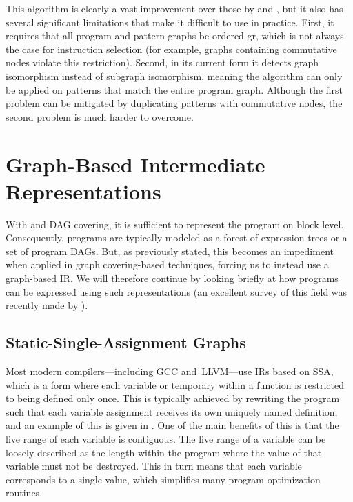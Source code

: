 This algorithm is clearly a vast improvement over those by
\citeauthor{Ullmann1976} and \citeauthor{Cordella2001}, but it also has several
significant limitations that make it difficult to use in practice.
%
First, it
requires that all \gls{program} and \glspl{pattern graph} be \gls{ordered gr},
which is not always the case for \gls{instruction selection} (for example,
\glspl{graph} containing commutative \glspl{node} violate this
restriction).
%
Second, in its current form it detects \gls{graph isomorphism}
instead of \gls{subgraph isomorphism}, meaning the algorithm can only be applied
on \glspl{pattern} that match the entire \gls{program graph}.
%
Although the first
problem can be mitigated by duplicating \glspl{pattern} with commutative
\glspl{node}, the second problem is much harder to overcome.


\section{Graph-Based Intermediate Representations}

With  and \gls{DAG covering}, it is sufficient to
represent the \gls{program} on \gls{block} level.
%
Consequently, \glspl{program}
are typically modeled as a \gls{forest} of \glspl{expression tree} or a set of
\glspl{program DAG}.
%
But, as previously stated, this becomes an impediment when
applied in \gls{graph covering}-based techniques, forcing us to instead use a
\gls{graph}-based \glsdesc{IR}.
%
We will therefore continue by looking briefly at
how \glspl{program} can be expressed using such representations (an excellent
survey of this field was recently made by \textcite{Stanier2013}).


\subsection{Static-Single-Assignment Graphs}

Most modern \glspl{compiler}---including \gls{GCC} and~\gls{LLVM}---use
\glspl{IR} based on \gls{SSA}, which is a form where each variable or
\gls{temporary} within a \gls{function} is restricted to being defined only
once.
%
This is typically achieved by rewriting the \gls{program} such that each
variable assignment receives its own uniquely named definition, and an example
of this is given in .
%
One of the main benefits of this is
that the \gls{live range} of each variable is contiguous.
%
The \gls{live range}
of a variable can be loosely described as the length within the \gls{program}
where the value of that variable must not be destroyed.
%
This in turn means that each variable corresponds to a single value, which
simplifies many \gls{program} optimization routines.

